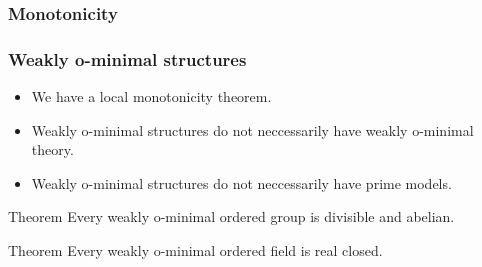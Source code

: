 \begin{frame}[t]\frametitle{Monotonicity}

\end{frame}

\begin{frame}[t]\frametitle{Weakly o-minimal structures}

    
	\begin{itemize}
		\item[$\color{darkred}\bigstar$] We have a local monotonicity theorem. \citep{arefiev1997monotonicity}
		\item[$\color{darkred}\bigstar$] Weakly o-minimal structures do not neccessarily have weakly o-minimal theory.
		\item[$\color{darkred}\bigstar$] Weakly o-minimal structures do not neccessarily have prime models.
	\end{itemize}

	\begin{beamerboxesrounded}[shadow=true]{Theorem \citep{macpherson2000weakly}}
		Every weakly o-minimal ordered group is divisible and abelian.
	\end{beamerboxesrounded}

	\begin{beamerboxesrounded}[shadow=true]{Theorem \citep{macpherson2000weakly}}
		Every weakly o-minimal ordered field is real closed.
	\end{beamerboxesrounded}
\end{frame}

